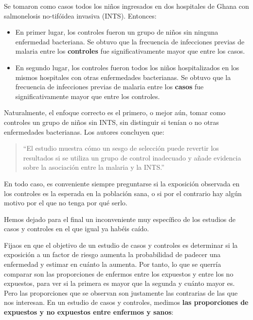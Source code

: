 \documentclass[
]{book}
\theoremstyle{definition}
\theoremstyle{definition}
\theoremstyle{definition}
\theoremstyle{definition}
\theoremstyle{remark}
\begin{document}
Se tomaron como casos todos los niños ingresados en dos hospitales de Ghana con salmonelosis no-tifóidea invasiva (INTS). Entonces:

\begin{itemize}
\item
  En primer lugar, los controles fueron un grupo de niños sin ninguna enfermedad bacteriana. Se obtuvo que la frecuencia de infecciones previas de malaria entre los \textbf{controles} fue significativamente mayor que entre los casos.
\item
  En segundo lugar, los controles fueron todos los niños hospitalizados en los mismos hospitales con otras enfermedades bacterianas. Se obtuvo que la frecuencia de infecciones previas de malaria entre los \textbf{casos} fue significativamente mayor que entre los controles.
\end{itemize}

Naturalmente, el enfoque correcto es el primero, o mejor aún, tomar como controles un grupo de niños sin INTS, sin distinguir si tenían o no otras enfermedades bacterianas. Los autores concluyen que:

\begin{quote}
``El estudio muestra cómo un sesgo de selección puede revertir los resultados si se utiliza un grupo de control inadecuado y añade evidencia sobre la asociación entre la malaria y la INTS.''
\end{quote}

\begin{rmdimportant}
En todo caso, es conveniente siempre preguntarse si la exposición observada en los controles es la esperada en la población sana, o si por el contrario hay algún motivo por el que no tenga por qué serlo.
\end{rmdimportant}

Hemos dejado para el final un inconveniente muy específico de los estudios de casos y controles en el que igual ya habéis caído.

Fijaos en que el objetivo de un estudio de casos y controles es determinar si la exposición a un factor de riesgo aumenta la probabilidad de padecer una enfermedad y estimar en cuánto la aumenta. Por tanto, lo que se querría comparar son las proporciones de enfermos entre los expuestos y entre los no expuestos, para ver si la primera es mayor que la segunda y cuánto mayor es. Pero las proporciones que se observan son justamente las contrarias de las que nos interesan. En un estudio de casos y controles, medimos \textbf{las proporciones de expuestos y no expuestos entre enfermos y sanos}:
\end{document}
